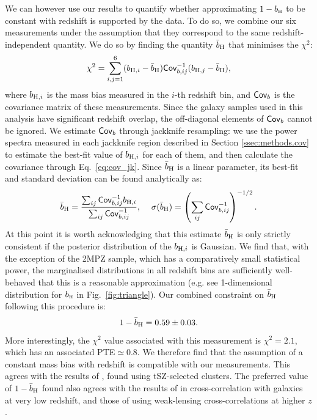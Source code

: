\documentclass[useAMS,usenatbib]{mn2e}
\def\bH{b_{\scriptscriptstyle\rm H}}
\begin{document}
      We can however use our results to quantify whether approximating $1-\bH$ to be constant with redshift is supported by the data. To do so, we combine our six measurements under the assumption that they correspond to the same redshift-independent quantity. We do so by finding the quantity $\bar{b}_{\rm H}$ that minimises the $\chi^2$:
      \begin{equation}
        \chi^2=\sum_{i,j=1}^6 (b_{{\rm H},i}-\bar{b}_{\rm H}){\sf Cov}^{-1}_{b,ij}(b_{{\rm H},j}-\bar{b}_{\rm H}),
      \end{equation}
      where $b_{{\rm H},i}$ is the mass bias measured in the $i$-th redshift bin, and ${\sf Cov}_b$ is the covariance matrix of these measurements. Since the galaxy samples used in this analysis have significant redshift overlap, the off-diagonal elements of ${\sf Cov}_b$ cannot be ignored. We estimate ${\sf Cov}_b$ through jackknife resampling: we use the power spectra measured in each jackknife region described in Section \ref{ssec:methods.cov} to estimate the best-fit value of $b_{{\rm H},i}$ for each of them, and then calculate the covariance through Eq.\!~\ref{eq:cov_jk}. Since $\bar{b}_{\rm H}$ is a linear parameter, its best-fit and standard deviation can be found analytically as:
      \begin{equation}
        \bar{b}_{\rm H}=\frac{\sum_{ij}{\sf Cov}_{b,ij}^{-1}b_{{\rm H},i}}{\sum_{ij}{\sf Cov}^{-1}_{b,ij}},
        \hspace{12pt}
        \sigma(\bar{b}_{\rm H})=\left(\sum_{ij}{\sf Cov}^{-1}_{b,ij}\right)^{-1/2}.
      \end{equation}
      At this point it is worth acknowledging that this estimate $\bar{b}_{\rm H}$ is only strictly consistent if the posterior distribution of the $b_{{\rm H},i}$ is Gaussian. We find that, with the exception of the 2MPZ sample, which has a comparatively small statistical power, the marginalised distributions in all redshift bins are sufficiently well-behaved that this is a reasonable approximation (e.g. see 1-dimensional distribution for $\bH$ in Fig.\!~\ref{fig:triangle}). Our combined constraint on $\bar{b}_{\rm H}$ following this procedure is:
      \begin{equation}
        1-\bar{b}_{\rm H}=0.59\pm0.03.
      \end{equation}
      More interestingly, the $\chi^2$ value associated with this measurement is $\chi^2=2.1$, which has an associated PTE$\simeq0.8$. We therefore find that the assumption of a constant mass bias with redshift is compatible with our measurements. This agrees with the results of \cite{2019A&A...626A..27S}, found using tSZ-selected clusters. The preferred value of $1-\bar{b}_{\rm H}$ found also agrees with the results of \cite{2018MNRAS.480.3928M} in cross-correlation with galaxies at very low redshift, and those of \cite{2019arXiv190707870M} using weak-lensing cross-correlations at higher $z$. 
      
\end{document}
